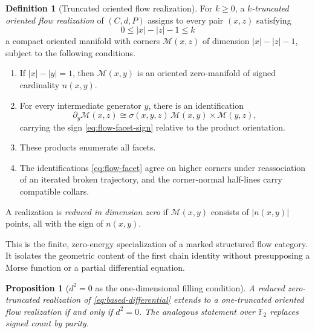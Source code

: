 \documentclass[11pt,letterpaper,twoside]{article}
\theoremstyle{plain}
\newtheorem{proposition}[theorem]{Proposition}
\theoremstyle{definition}
\newtheorem{definition}[theorem]{Definition}
\theoremstyle{remark}
\begin{document}
\begin{definition}[Truncated oriented flow realization]\label{def:truncated-flow}
For \(k\geq 0\), a \emph{\(k\)-truncated oriented flow realization} of \((C,d,P)\) assigns to every pair \((x,z)\) satisfying
\[
 0\leq |x|-|z|-1\leq k
\]
a compact oriented manifold with corners \(\mathcal M(x,z)\) of dimension \(|x|-|z|-1\), subject to the following conditions.
\begin{enumerate}
\item If \(|x|-|y|=1\), then \(\mathcal M(x,y)\) is an oriented zero-manifold of signed cardinality \(n(x,y)\).
\item For every intermediate generator \(y\), there is an identification
\begin{equation}\label{eq:flow-facet}
 \partial_y\mathcal M(x,z)
 \cong \sigma(x,y,z)\,
 \mathcal M(x,y)\times\mathcal M(y,z),
\end{equation}
carrying the sign \eqref{eq:flow-facet-sign} relative to the product orientation.
\item These products enumerate all facets.
\item The identifications \eqref{eq:flow-facet} agree on higher corners under reassociation of an iterated broken trajectory, and the corner-normal half-lines carry compatible collars.
\end{enumerate}
A realization is \emph{reduced in dimension zero} if \(\mathcal M(x,y)\) consists of \(|n(x,y)|\) points, all with the sign of \(n(x,y)\).
\end{definition}

This is the finite, zero-energy specialization of a marked structured flow category.  It isolates the geometric content of the first chain identity without presupposing a Morse function or a partial differential equation.

\begin{proposition}[\(d^2=0\) as the one-dimensional filling condition]\label{prop:d2-realization}
A reduced zero-truncated realization of \eqref{eq:based-differential} extends to a one-truncated oriented flow realization if and only if \(d^2=0\).  The analogous statement over \(\mathbb F_2\) replaces signed count by parity.
\end{proposition}
\end{document}
